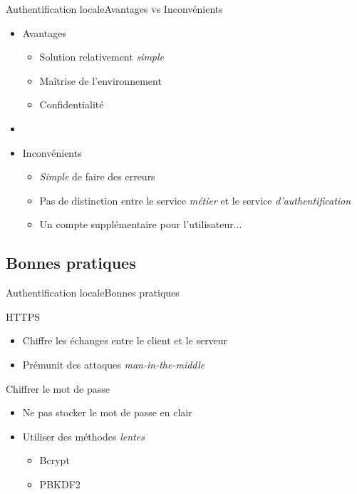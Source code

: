 \documentclass{beamer}
\begin{document}
\begin{frame}{Authentification locale}{Avantages vs Inconvénients}
  \begin{center}
    \begin{itemize}
      \item Avantages
      \begin{itemize}
        \item Solution relativement \emph{simple}
        \item Maîtrise de l'environnement
        \item Confidentialité
      \end{itemize}
      \pause
      \item[~]
      \item Inconvénients
      \begin{itemize}
        \item \emph{Simple} de faire des erreurs
        \item Pas de distinction entre le service \emph{métier} et le service \emph{d'authentification}
        \item Un compte supplémentaire pour l'utilisateur...
      \end{itemize}
    \end{itemize}
  \end{center}
\end{frame}

\subsection{Bonnes pratiques}

\begin{frame}{Authentification locale}{Bonnes pratiques}
  \begin{center}
    \begin{block}{HTTPS}
      \begin{itemize}
        \item Chiffre les échanges entre le client et le serveur
        \item Prémunit des attaques \emph{man-in-the-middle}
      \end{itemize}
    \end{block}
    \begin{block}{Chiffrer le mot de passe}
      \begin{itemize}
        \item Ne pas stocker le mot de passe en clair
        \item Utiliser des méthodes \emph{lentes}
          \begin{itemize}
            \item Bcrypt
            \item PBKDF2
          \end{itemize}
      \end{itemize}
    \end{block}
  \end{center}
\end{frame}
\end{document}
